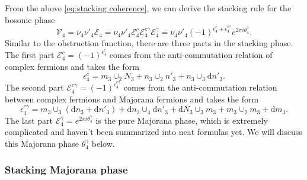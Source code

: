 \documentclass[%
 reprint,
 amsmath,amssymb,
 aps,
prb,
]{revtex4-2}
\begin{document}
From the above \eqref{eq:stacking coherence}, we can derive the stacking rule for the bosonic phase
\begin{equation}
\mathcal{V}_{4} =\nu _{4} \nu '_{4}\mathcal{E}_{4} =\nu _{4} \nu '_{4}\mathcal{E}_{4}^{c}\mathcal{E}_{4}^{c\gamma }\mathcal{E}_{4}^{\gamma } =\nu _{4} \nu '_{4}( -1)^{\epsilon _{4}^{c} +\epsilon _{4}^{c\gamma }} e^{2\pi i\theta _{4}^{\gamma }} .\label{eq:bosonic stacking rule}
\end{equation}
Similar to the obstruction function, there are three parts in the stacking phase.
The first part $\mathcal{E}_{4}^{c}=( -1)^{\epsilon _{4}^{c}}$ comes from the anti-commutation relation of complex fermions and takes the form 
\begin{equation}
\epsilon _{4}^{c}  =  m_{3} \cup _{2} N_{3} +n_{3} \cup _{2} n'_{3} +n_{3} \cup _{3}\mathrm{d} n'_{3} .
\end{equation}
The second part $\mathcal{E}_{4}^{c \gamma}=( -1)^{\epsilon _{4}^{c \gamma}}$ comes from the anti-commutation relation between complex fermions and Majorana fermions and takes the form 
\begin{equation}
\epsilon _{4}^{c\gamma }  =  m_{3} \cup _{3}(\mathrm{d} n_{3} +\mathrm{d} n'_{3}) +\mathrm{d} n_{3} \cup _{4}\mathrm{d} n'_{3} +\mathrm{d} N_{3} \cup _{3} m_{3} +m_{3} \cup _{2} m_{3} +\mathrm{d} m_{3} .
\end{equation}
The last part $\mathcal{E}_{4}^{\gamma}=e^{2\pi i\theta _{4}^{\gamma }}$ is the pure Majorana phase, which is extremely complicated and haven't been summarized into neat formulas yet.
We will discuss this Majorana phase $\theta _{4}^{\gamma }$ below.

\subsubsection{Stacking Majorana phase}
\end{document}
